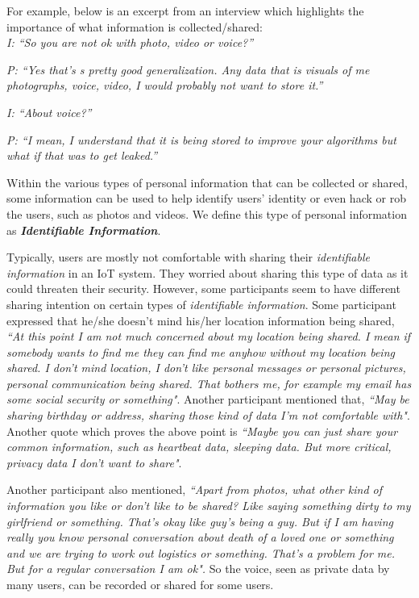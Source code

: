 For example,
below is an excerpt from an interview which highlights the importance of what information is collected/shared:\\

\textit{I: ``So you are not ok with photo, video or voice?''\\}

\textit{P: ``Yes that's s pretty good generalization. Any data that is visuals of me photographs, voice, video, I would probably not want to store it.''\\}

\textit{I: ``About voice?''\\}

\textit{P: ``I mean, I understand that it is being stored to improve your algorithms but what if that was to get leaked.''\\}

Within the various types of personal information that can be collected or shared, some information can be used to help identify users' identity or even hack or rob the users, such as photos and videos. We define this type of personal information as \textbf{\textit{Identifiable Information}}.

Typically, users are mostly not comfortable with sharing their \textit{identifiable information} in an IoT system. They worried about sharing this type of data as it could threaten their security. However, some participants seem to have different sharing intention on certain types of \textit{identifiable information}. Some participant expressed that he/she doesn't mind his/her location information being shared, \textit{``At this point I am not much concerned about my location being shared. I mean if somebody wants to find me they can find me anyhow without my location being shared. I don't mind location, I don't like personal messages or personal pictures, personal communication being shared. That bothers me, for example my email has some social security or something"}. Another participant mentioned that, \textit{``May be sharing birthday or address, sharing those kind of data I'm not comfortable with"}. Another quote which proves the above point is \textit{``Maybe you can just share your common information, such as heartbeat data, sleeping data. But more critical, privacy data I don't want to share"}.

Another participant also mentioned, \textit {``Apart from photos, what other kind of information you like or don't like to be shared? Like saying something dirty to my girlfriend or something. That's okay like guy's being a guy. But if I am having really you know personal conversation about death of a loved one or something and we are trying to work out logistics or something. That's a problem for me. But for a regular conversation I am ok".} So the voice, seen as private data by many users, can be recorded or shared for some users.

